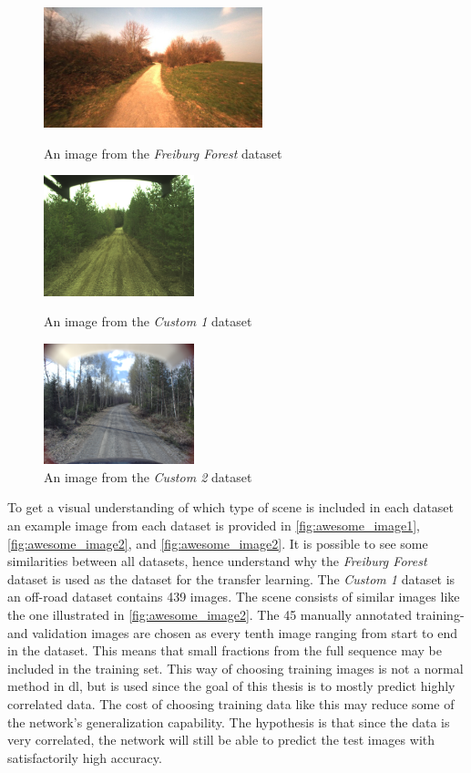 \documentclass[USenglish]{ifimaster}  %
\begin{document}
\begin{figure}[ht]
  \includegraphics[width=\linewidth, height=3.5cm]{bilder/freiburg.png}
  \caption{An image from the \textit{Freiburg Forest} dataset}\label{fig:awesome_image1}
\endminipage\hfill
{}
  \includegraphics[width=\linewidth, height=3.5cm]{bilder/custom_1.png}
  \caption{An image from the \textit{Custom 1} dataset}\label{fig:awesome_image2}
\endminipage\hfill
{}%
  \includegraphics[width=\linewidth, height=3.5cm]{bilder/custom_2.png}
  \caption{An image from the \textit{Custom 2} dataset}\label{fig:awesome_image3}
\endminipage
\end{figure}

To get a visual understanding of which type of scene is included in each dataset an example image from each dataset is provided in \cref{fig:awesome_image1}, \cref{fig:awesome_image2}, and \cref{fig:awesome_image2}. It is possible to see some similarities between all datasets, hence understand why the \textit{Freiburg Forest} dataset is used as the dataset for the transfer learning. The \textit{Custom 1} dataset is an off-road dataset contains 439 images. The scene consists of similar images like the one illustrated in \cref{fig:awesome_image2}. The 45 manually annotated training- and validation images are chosen as every tenth image ranging from start to end in the dataset. This means that small fractions from the full sequence may be included in the training set. This way of choosing training images is not a normal method in \ac{dl}, but is used since the goal of this thesis is to mostly predict highly correlated data. The cost of choosing training data like this may reduce some of the network's generalization capability. The hypothesis is that since the data is very correlated, the network will still be able to predict the test images with satisfactorily high accuracy. 
\end{document}

